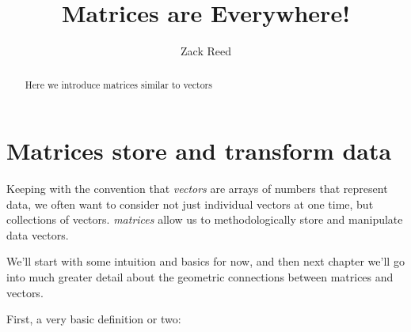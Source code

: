 \documentclass{ximera}
\author{Zack Reed} %
\title{Matrices are Everywhere!}
\begin{document}
\begin{abstract}
Here we introduce matrices similar to vectors
\end{abstract}
\maketitle


\section{Matrices store and transform data}

Keeping with the convention that \emph{vectors} are arrays of numbers that represent data, we often want to consider not just individual vectors at one time, but collections of vectors. \emph{matrices} allow us to methodologically store and manipulate data vectors.

We'll start with some intuition and basics for now, and then next chapter we'll go into much greater detail about the geometric connections between matrices and vectors.

First, a very basic definition or two:
\end{document}
